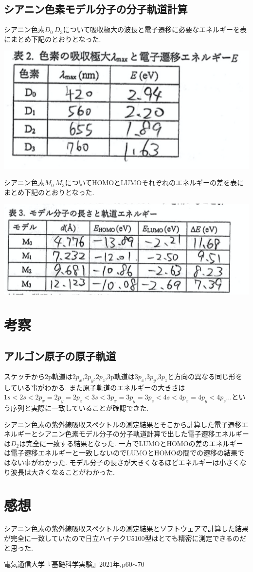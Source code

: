 \documentclass[a4j,10pt,dvipdfmx]{jarticle}
\begin{document}
  \subsection{シアニン色素モデル分子の分子軌道計算}
  シアニン色素$D_0~D_3$について吸収極大の波長と電子遷移に必要なエネルギーを表にまとめ下記のとおりとなった.
  \begin{center}
    \includegraphics[width=15cm]{2.png}
  \end{center}

  シアニン色素$M_0~M_3$についてHOMOとLUMOそれぞれのエネルギーの差を表にまとめ下記のとおりとなった.
  \begin{center}
    \includegraphics[width=15cm]{3.png}
  \end{center}
  \section{考察}
  \subsection{アルゴン原子の原子軌道}
  スケッチから2p軌道は$2p_x$,$2p_y$,$2p_z$,3p軌道は$3p_x$,$3p_y$,$3p_z$と方向の異なる同じ形をしている事がわかる.
  また原子軌道のエネルギーの大きさは$1s<2s<2p_x=2p_y=2p_z<3s<3p_x=3p_y=3p_z<4s<4p_x=4p_y<4p_z$...という序列と実際に一致していることが確認できた.


  シアニン色素の紫外線吸収スペクトルの測定結果とそこから計算した電子遷移エネルギーとシアニン色素モデル分子の分子軌道計算で出した電子遷移エネルギーは$D_2$は完全に一致する結果となった.
  一方でLUMOとHOMOの差のエネルギーは電子遷移エネルギーと一致しないのでLUMOとHOMOの間での遷移の結果ではない事がわかった.
  モデル分子の長さが大きくなるほどエネルギーは小さくなり波長は大きくなることがわかった.
  \section{感想}
  シアニン色素の紫外線吸収スペクトルの測定結果とソフトウェアで計算した結果が完全に一致していたので日立ハイテクU5100型はとても精密に測定できるのだと思った.
  \begin{thebibliography}{9}
     電気通信大学『基礎科学実験』2021年,p60$\sim$70
  \end{thebibliography}
\end{document}
